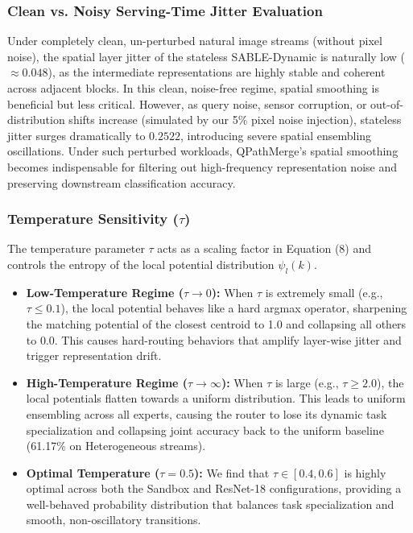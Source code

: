 \subsubsection{Clean vs. Noisy Serving-Time Jitter Evaluation}
Under completely clean, un-perturbed natural image streams (without pixel noise), the spatial layer jitter of the stateless SABLE-Dynamic is naturally low ($\approx 0.048$), as the intermediate representations are highly stable and coherent across adjacent blocks. In this clean, noise-free regime, spatial smoothing is beneficial but less critical. However, as query noise, sensor corruption, or out-of-distribution shifts increase (simulated by our 5\% pixel noise injection), stateless jitter surges dramatically to $0.2522$, introducing severe spatial ensembling oscillations. Under such perturbed workloads, QPathMerge's spatial smoothing becomes indispensable for filtering out high-frequency representation noise and preserving downstream classification accuracy.

\subsubsection{Temperature Sensitivity ($\tau$)}
The temperature parameter $\tau$ acts as a scaling factor in Equation (8) and controls the entropy of the local potential distribution $\psi_l(k)$. 
\begin{itemize}
    \item \textbf{Low-Temperature Regime ($\tau \to 0$):} When $\tau$ is extremely small (e.g., $\tau \le 0.1$), the local potential behaves like a hard argmax operator, sharpening the matching potential of the closest centroid to 1.0 and collapsing all others to 0.0. This causes hard-routing behaviors that amplify layer-wise jitter and trigger representation drift.
    \item \textbf{High-Temperature Regime ($\tau \to \infty$):} When $\tau$ is large (e.g., $\tau \ge 2.0$), the local potentials flatten towards a uniform distribution. This leads to uniform ensembling across all experts, causing the router to lose its dynamic task specialization and collapsing joint accuracy back to the uniform baseline (61.17\% on Heterogeneous streams).
    \item \textbf{Optimal Temperature ($\tau = 0.5$):} We find that $\tau \in [0.4, 0.6]$ is highly optimal across both the Sandbox and ResNet-18 configurations, providing a well-behaved probability distribution that balances task specialization and smooth, non-oscillatory transitions.
\end{itemize}

